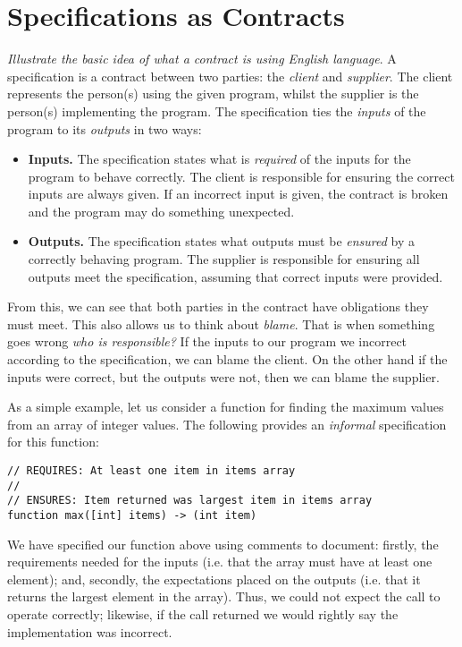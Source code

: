 \section{Specifications as Contracts}
{\em Illustrate the basic idea of what a contract is using English language}.
A specification is a contract between two parties: the {\em client} and {\em supplier}.  The client represents the person(s) using the given program, whilst the supplier is the person(s) implementing the program.  The specification ties the {\em inputs} of the program to its {\em outputs} in two ways:
\begin{itemize}
\item {\bf Inputs.} The specification states what is {\em required} of the inputs for the program to behave correctly.  The client is responsible for ensuring the correct inputs are always given.  If an incorrect input is given, the contract is broken and the program may do something unexpected.
\item {\bf Outputs.} The specification states what outputs must be {\em ensured} by a correctly behaving program.  The supplier is responsible for ensuring all outputs meet the specification, assuming that correct inputs were provided.
\end{itemize}
From this, we can see that both parties in the contract have obligations they must meet.  This also allows us to think about {\em blame}.  That is when something goes wrong {\em who is responsible?}  If the inputs to our program we incorrect according to the specification, we can blame the client.  On the other hand if the inputs were correct, but the outputs were not, then we can blame the supplier.

\begin{eg}
As a simple example, let us consider a function for finding the maximum values from an array of integer values.  The following provides an {\em informal} specification for this function:
\begin{lstlisting}
// REQUIRES: At least one item in items array
//
// ENSURES: Item returned was largest item in items array
function max([int] items) -> (int item)
\end{lstlisting}
We have specified our function above using comments to document: firstly, the requirements needed for the inputs (i.e. that the array must have at least one element); and, secondly, the expectations placed on the outputs (i.e. that it returns the largest element in the array).  Thus, we could not expect the call  to operate correctly; likewise, if the call  returned  we would rightly say the implementation was incorrect.
\end{eg}

